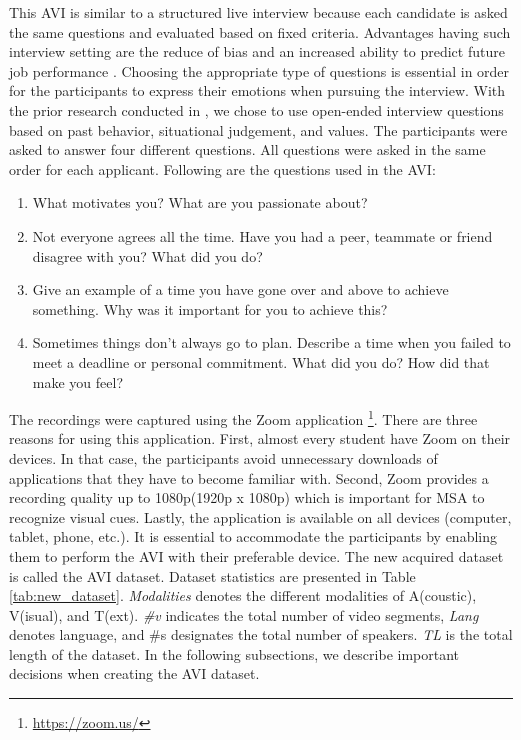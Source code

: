 %
This AVI is similar to a structured live interview because each candidate is asked the same questions and evaluated based on fixed criteria. Advantages having such interview setting are the reduce of bias and an increased ability to predict future job performance \cite{increase-job-performance-mcdaniel1994validity}. Choosing the appropriate type of questions is essential in order for the participants to express their emotions when pursuing the interview. With the prior research conducted in \cite{personality-prediction-questions-9121971}, we chose to use open-ended interview questions based on past behavior, situational judgement, and values. The participants were asked to answer four different questions. All questions were asked in the same order for each applicant. Following are the questions used in the AVI:
%
\begin{enumerate}
    \item What motivates you? What are you passionate about?
    \item Not everyone agrees all the time. Have you had a peer, teammate or friend disagree with you? What did you do?
    \item Give an example of a time you have gone over and above to achieve something. Why was it important for you to achieve this?
    \item Sometimes things don’t always go to plan. Describe a time when you failed to meet a deadline or personal commitment. What did you do? How did that make you feel?
\end{enumerate}
%
The recordings were captured using the Zoom application \footnote{\url{https://zoom.us/}}. There are three reasons for using this application. First, almost every student have Zoom on their devices. In that case, the participants avoid unnecessary downloads of applications that they have to become familiar with. Second, Zoom provides a recording quality up to 1080p(1920p x 1080p) which is important for MSA to recognize visual cues. Lastly, the application is available on all devices (computer, tablet, phone, etc.). It is essential to accommodate the participants by enabling them to perform the AVI with their preferable device. The new acquired dataset is called the AVI dataset. Dataset statistics are presented in Table \ref{tab:new_dataset}. \textit{Modalities} denotes the different modalities of A(coustic), V(isual), and T(ext). \textit{\#v} indicates the total number of video segments, \textit{Lang} denotes language, and \#s designates the total number of speakers. \textit{TL} is the total length of the dataset. In the following subsections, we describe important decisions when creating the AVI dataset. 
